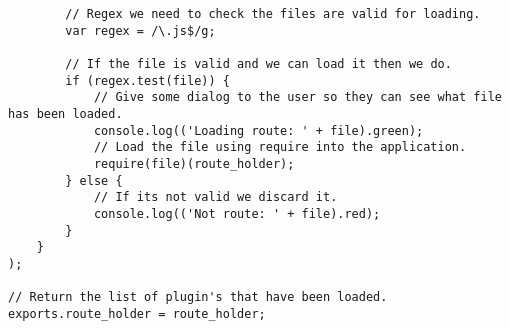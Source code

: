 \begin{lstlisting}
        // Regex we need to check the files are valid for loading.
        var regex = /\.js$/g;

        // If the file is valid and we can load it then we do.
        if (regex.test(file)) {
            // Give some dialog to the user so they can see what file has been loaded.
            console.log(('Loading route: ' + file).green);
            // Load the file using require into the application.
            require(file)(route_holder);
        } else {
            // If its not valid we discard it.
            console.log(('Not route: ' + file).red);
        }
    }
);

// Return the list of plugin's that have been loaded.
exports.route_holder = route_holder;
\end{lstlisting}